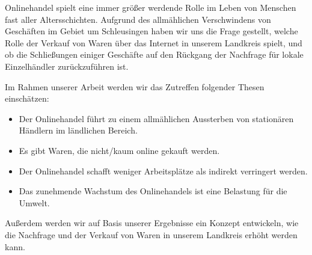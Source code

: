 



Onlinehandel spielt eine immer größer werdende Rolle im Leben von Menschen fast aller Altersschichten. Aufgrund des allmählichen Verschwindens von Geschäften im Gebiet um Schleusingen haben wir uns die Frage gestellt, welche Rolle der Verkauf von Waren über das Internet in unserem Landkreis spielt, und ob die Schließungen einiger Geschäfte auf den Rückgang der Nachfrage für lokale Einzelhändler zurückzuführen ist.

Im Rahmen unserer Arbeit werden wir das Zutreffen folgender Thesen einschätzen:
\begin{itemize}
    \item Der Onlinehandel führt zu einem allmählichen Aussterben von stationären Händlern im ländlichen Bereich.
    
    \item Es gibt Waren, die nicht/kaum online gekauft werden.

    \item Der Onlinehandel schafft weniger Arbeitsplätze als indirekt verringert werden.
    
    \item Das zunehmende Wachstum des Onlinehandels ist eine Belastung für die Umwelt.
\end{itemize}

Außerdem werden wir auf Basis unserer Ergebnisse ein Konzept entwickeln, wie die Nachfrage und der Verkauf von Waren in unserem Landkreis erhöht werden kann.
